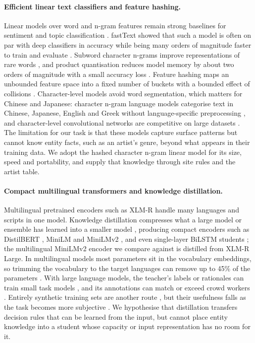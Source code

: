 \documentclass[11pt]{article}
\begin{document}
\paragraph{Efficient linear text classifiers and feature hashing.}
Linear models over word and n-gram features remain strong baselines for sentiment and topic classification \citep{wang2012baselines}. fastText showed that such a model is often on par with deep classifiers in accuracy while being many orders of magnitude faster to train and evaluate \citep{joulin2017bag}. Subword character n-grams improve representations of rare words \citep{bojanowski2017enriching}, and product quantisation reduces model memory by about two orders of magnitude with a small accuracy loss \citep{joulin2016fasttextzip}. Feature hashing maps an unbounded feature space into a fixed number of buckets with a bounded effect of collisions \citep{weinberger2009feature}. Character-level models avoid word segmentation, which matters for Chinese and Japanese: character n-gram language models categorise text in Chinese, Japanese, English and Greek without language-specific preprocessing \citep{peng2003language}, and character-level convolutional networks are competitive on large datasets \citep{zhang2015character}. The limitation for our task is that these models capture surface patterns but cannot know entity facts, such as an artist's genre, beyond what appears in their training data. We adopt the hashed character n-gram linear model for its size, speed and portability, and supply that knowledge through site rules and the artist table.

\paragraph{Compact multilingual transformers and knowledge distillation.}
Multilingual pretrained encoders such as XLM-R \citep{conneau2020unsupervised} handle many languages and scripts in one model. Knowledge distillation compresses what a large model or ensemble has learned into a smaller model \citep{hinton2015distilling}, producing compact encoders such as DistilBERT \citep{sanh2019distilbert}, MiniLM \citep{wang2020minilm} and MiniLMv2 \citep{wang2021minilmv2}, and even single-layer BiLSTM students \citep{tang2019distilling}; the multilingual MiniLMv2 encoder we compare against is distilled from XLM-R Large. In multilingual models most parameters sit in the vocabulary embeddings, so trimming the vocabulary to the target languages can remove up to 45\% of the parameters \citep{abdaoui2020load}. With large language models, the teacher's labels or rationales can train small task models \citep{hsieh2023distilling,wang2021want}, and its annotations can match or exceed crowd workers \citep{gilardi2023chatgpt}. Entirely synthetic training sets are another route \citep{long2024llmsdriven}, but their usefulness falls as the task becomes more subjective \citep{li2023synthetic}. We hypothesise that distillation transfers decision rules that can be learned from the input, but cannot place entity knowledge into a student whose capacity or input representation has no room for it.
\end{document}
